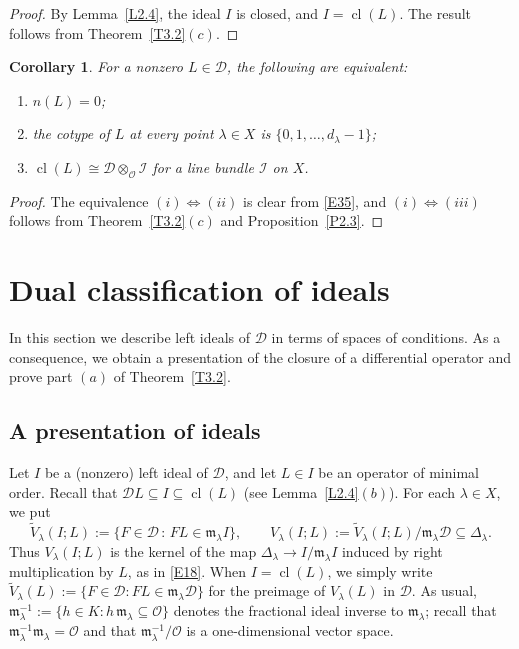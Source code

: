 \documentclass[11pt,reqno]{amsart}
\theoremstyle{plain}
\newtheorem{corollary}{Corollary}[section]
\theoremstyle{definition}
\theoremstyle{remark}
\numberwithin{equation}{section}
\newcommand{\cD}{\mathcal{D}}
\newcommand{\cO}{\mathcal{O}}
\newcommand{\ml}{\mathfrak{m}_\lambda}
\newcommand{\Dl}{\Delta_\lambda}
\DeclareMathOperator{\cl}{cl}
\begin{document}
\begin{proof}
By Lemma~\ref{L2.4}, the ideal $I$ is closed, and $I = \cl(L)$. The result follows from
Theorem~\ref{T3.2}$(c)$.
\end{proof}

\begin{corollary}
\label{C3.3}
For a nonzero $L \in \cD$, the following are equivalent:
\begin{enumerate}
\item[(i)] $n(L) = 0$;
\item[(ii)] the cotype of $L$ at every point $\lambda \in X$ is $\{0, 1, \ldots, d_\lambda - 1\}$;
\item[(iii)] $\cl(L) \cong \cD \otimes_{\cO} \mathcal{I}$ for a line bundle $\mathcal{I}$ on $X$.
\end{enumerate}
\end{corollary}

\begin{proof}
The equivalence $(i) \Leftrightarrow (ii)$ is clear from \eqref{E35}, and
$(i) \Leftrightarrow (iii)$ follows from Theorem~\ref{T3.2}$(c)$ and Proposition~\ref{P2.3}.
\end{proof}


\section{Dual classification of ideals}
\label{S4}

In this section we describe left ideals of $\cD$ in terms of spaces of conditions. As a
consequence, we obtain a presentation of the closure of a differential operator and prove part
$(a)$ of Theorem~\ref{T3.2}.

\subsection{A presentation of ideals}
\label{S4.1}
Let $I$ be a (nonzero) left ideal of $\cD$, and let $L \in I$ be an operator of minimal order.
Recall that $\cD L \subseteq I \subseteq \cl(L)$ (see Lemma~\ref{L2.4}$(b)$). For each
$\lambda \in X$, we put
\begin{equation}
\label{E41}
  \widetilde{V}_\lambda(I;L) := \{ F \in \cD \, : \, F L \in \ml I \} , \qquad
  V_\lambda(I;L) := \widetilde{V}_\lambda(I;L)/\ml \cD \subseteq \Dl .
\end{equation}
Thus $V_\lambda(I;L)$ is the kernel of the map $\Dl \to I/\ml I$ induced by right multiplication
by $L$, as in \eqref{E18}. When $I = \cl(L)$, we simply write $\widetilde{V}_\lambda(L) := \{F \in
\cD : FL \in \ml \cD\}$ for the preimage of $V_\lambda(L)$ in $\cD$. As usual, $\ml^{-1} := \{ h
\in K : h\, \ml \subseteq \cO\}$ denotes the fractional ideal inverse to $\ml$; recall that
$\ml^{-1} \ml = \cO$ and that $\ml^{-1}/\cO$ is a one-dimensional vector space.
\end{document}
